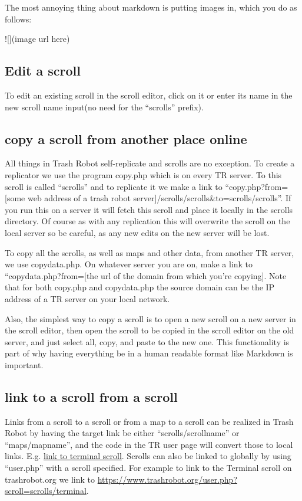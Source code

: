 The most annoying thing about markdown is putting images in, which you
do as follows:

![](image url here)

\subsection{Edit a scroll}\label{edit-a-scroll}

To edit an existing scroll in the scroll editor, click on it or enter
its name in the new scroll name input(no need for the ``scrolls''
prefix).

\subsection{copy a scroll from another place
online}\label{copy-a-scroll-from-another-place-online}

All things in Trash Robot self-replicate and scrolls are no exception.
To create a replicator we use the program copy.php which is on every TR
server. To this scroll is called ``scrolls'' and to replicate it we make
a link to ``copy.php?from={[}some web address of a trash robot
server{]}/scrolls/scrolls\&to=scrolls/scrolls''. If you run this on a
server it will fetch this scroll and place it locally in the scrolls
directory. Of course as with any replication this will overwrite the
scroll on the local server so be careful, as any new edits on the new
server will be lost.

To copy all the scrolls, as well as maps and other data, from another TR
server, we use copydata.php. On whatever server you are on, make a link
to ``copydata.php?from={[}the url of the domain from which you're
copying{]}. Note that for both copy.php and copydata.php the source
domain can be the IP address of a TR server on your local network.

Also, the simplest way to copy a scroll is to open a new scroll on a new
server in the scroll editor, then open the scroll to be copied in the
scroll editor on the old server, and just select all, copy, and paste to
the new one. This functionality is part of why having everything be in a
human readable format like Markdown is important.

\subsection{link to a scroll from a
scroll}\label{link-to-a-scroll-from-a-scroll}

Links from a scroll to a scroll or from a map to a scroll can be
realized in Trash Robot by having the target link be either
``scrolls/scrollname'' or ``maps/mapname'', and the code in the TR user
page will convert those to local links. E.g.
\href{scrolls/terminal}{link to terminal scroll}. Scrolls can also be
linked to globally by using ``user.php'' with a scroll specified. For
example to link to the Terminal scroll on trashrobot.org we link to
\url{https://www.trashrobot.org/user.php?scroll=scrolls/terminal}.

